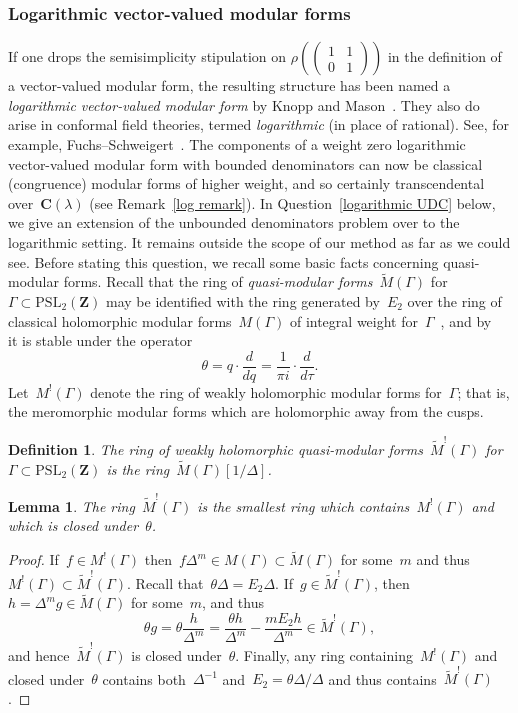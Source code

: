 \documentclass[10pt]{amsart}
\def\PSL{\mathrm{PSL}}
\def\WM{\widetilde{M}}
\def\Z{\mathbf{Z}}
\newtheorem{lemma}[subsubsection]{Lemma}
\newtheorem{df}[subsubsection]{Definition}
\theoremstyle{remark}
\numberwithin{equation}{subsection}
\def\C{\mathbf{C}}
\begin{document}
\subsubsection{Logarithmic vector-valued modular forms}
If one drops the semisimplicity stipulation on $\rho  \left(\begin{pmatrix} 1 & 1 \\ 0 & 1 \end{pmatrix}\right)$ in the 
definition of a vector-valued modular form,  the resulting structure has been named a \emph{logarithmic vector-valued modular form} by Knopp and Mason~\cite{KnoppMasonLog}. They also do arise in conformal field theories, termed \emph{logarithmic} (in place of rational). See, for example, Fuchs--Schweigert~\cite{FuchsSchweigert}.  
The components of  a weight zero logarithmic vector-valued modular form with bounded denominators can now be classical
(congruence) modular forms of higher weight, and so certainly transcendental over~$\C(\lambda)$
(see Remark~\ref{log remark}).
In Question~\ref{logarithmic UDC} below, we give
an extension of the unbounded denominators problem over to the logarithmic setting. It remains outside the scope of our method as far as we could see. 
Before stating this question, we recall some basic facts concerning quasi-modular forms.
Recall that the ring of  \emph{quasi-modular forms}~$\WM(\Gamma)$ for~$\Gamma \subset \PSL_2(\Z)$ may be identified with the ring generated by~$E_2$
over the ring of classical holomorphic modular forms~$M(\Gamma)$ of integral weight for~$\Gamma$~\cite[Prop~20(ii)]{Zagier123}, and 
by~\cite[Prop~20(i)]{Zagier123} it is stable
under the operator
$$\theta = q \cdot \frac{d}{dq} =  \frac{1}{\pi i } \cdot \frac{d}{d \tau}.$$
Let~$M^{!}(\Gamma)$ denote the ring of weakly holomorphic modular forms for~$\Gamma$; that is,
the meromorphic modular forms which are holomorphic away from the cusps.

\begin{df} The ring of \emph{weakly holomorphic quasi-modular forms}~$\WM^{!}(\Gamma)$ for~$\Gamma \subset \PSL_2(\Z)$ is  the 
ring~$\WM(\Gamma)[1/\Delta]$.
\end{df}


\begin{lemma} The ring~$\WM^{!}(\Gamma)$ is the smallest ring which contains~$M^{!}(\Gamma)$
and which is closed under~$\theta$.
\end{lemma}

\begin{proof}  If~$f \in M^{!}(\Gamma)$ then~$f \Delta^m \in M(\Gamma) \subset \WM(\Gamma)$
for some~$m$ and thus~$M^{!}(\Gamma) \subset \WM^{!}(\Gamma)$.
Recall that~$\theta \Delta = E_2 \Delta$.
If~$g \in \WM^{!}(\Gamma)$, then~$h = \Delta^m g \in \WM(\Gamma)$ for some~$m$,
and thus
$$ \theta g =  \theta \frac{h}{\Delta^m} =
 \frac{\theta h}{\Delta^m} - \frac{m E_2 h}{\Delta^m} \in \WM^{!}(\Gamma),$$
 and hence~$\WM^{!}(\Gamma)$ is closed under~$\theta$. 
 Finally, any ring containing~$M^{!}(\Gamma)$ and closed under~$\theta$ contains both~$\Delta^{-1}$
 and~$E_2 = \theta \Delta/\Delta$ and thus contains~$\WM^{!}(\Gamma)$.
 \end{proof}
\end{document}
